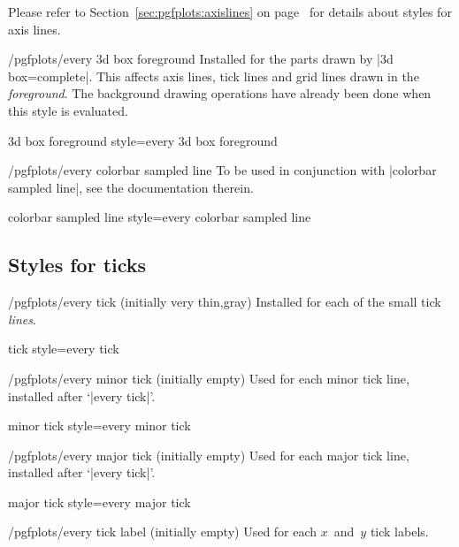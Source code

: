 \noindent Please refer to Section~\ref{sec:pgfplots:axislines} on
page~\pageref{pgfplots:page:axislines} for details about styles for axis lines.

\begin{stylekey}{/pgfplots/every 3d box foreground}
    Installed for the parts drawn by |3d box=complete|. This affects axis
    lines, tick lines and grid lines drawn in the \emph{foreground}. The
    background drawing operations have already been done when this style is
    evaluated.
\end{stylekey}

\pgfplotsshortstylekey 3d box foreground style=every 3d box foreground\pgfeov

\begin{stylekey}{/pgfplots/every colorbar sampled line}
    To be used in conjunction with |colorbar sampled line|, see the
    documentation therein.
\end{stylekey}

\pgfplotsshortstylekey colorbar sampled line style=every colorbar sampled line\pgfeov


\subsection*{Styles for ticks}

\begin{stylekey}{/pgfplots/every tick (initially very thin,gray)}
    Installed for each of the small tick \emph{lines}.
\end{stylekey}

\pgfplotsshortstylekey tick style=every tick\pgfeov

\begin{stylekey}{/pgfplots/every minor tick (initially empty)}
    Used for each minor tick line, installed after `|every tick|'.
\end{stylekey}

\pgfplotsshortstylekey minor tick style=every minor tick\pgfeov

\begin{stylekey}{/pgfplots/every major tick (initially empty)}
    Used for each major tick line, installed after `|every tick|'.
\end{stylekey}

\pgfplotsshortstylekey major tick style=every major tick\pgfeov

\begin{stylekey}{/pgfplots/every tick label (initially empty)}
    Used for each $x$~and~$y$ tick labels.
\end{stylekey}

